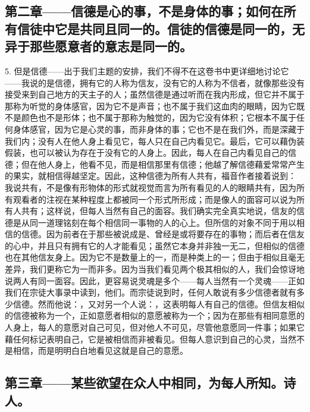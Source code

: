 \subsection{第二章——信德是心的事，不是身体的事；如何在所有信徒中它是共同且同一的。信徒的信德是同一的，无异于那些愿意者的意志是同一的。}

5. 但是信德——出于我们主题的安排，我们不得不在这卷书中更详细地讨论它——我说的是信德，拥有它的人称为信友，没有它的人称为不信者，就像那些没有接受来到自己地方的天主子的人；虽然信德是通过听而在我内形成，但它并不属于那称为听觉的身体感官，因为它不是声音；也不属于我们这血肉的眼睛，因为它既不是颜色也不是形体；也不属于那称为触觉的，因为它没有体积；它根本不属于任何身体感官，因为它是心灵的事，而非身体的事；它也不是在我们外，而是深藏于我们内；没有人在他人身上看见它，每人只在自己内看见它。最后，它可以藉伪装假装，也可以被认为存在于没有它的人身上。因此，每人在自己内看见自己的信德；但在他人身上，他看不见，而是相信那里有信德；他越了解信德藉爱常常产生的果实，就相信得越坚定。因此，这种信德为所有人共有，福音作者接着说到： 我说共有，不是像有形物体的形式就视觉而言为所有看见的人的眼睛共有，因为所有观看者的注视在某种程度上都被同一个形式所形成；而是像人的面容可以说为所有人共有；这样说，但每人当然有自己的面容。我们确实完全真实地说，信友的信德是从同一道理铭刻在每个相信同一事物的人的心上。但所信的对象不同于用以相信的信德。因为前者在于那些被说成是、曾经是或将要存在的事物；而后者在信友的心中，并且只有拥有它的人才能看见；虽然它本身并非独一无二，但相似的信德也在其他信友身上。因为它不是数量上的一，而是种类上的一；但由于相似且毫无差异，我们更称它为一而非多。因为当我们看见两个极其相似的人，我们会惊讶地说两人有同一面容。因此，更容易说灵魂是多个——每人当然有一个灵魂——正如我们在宗徒大事录中读到，他们。而宗徒说到时，任何人敢说有多少信德者就有多少信德。然而他说：，又对另一个人说：，这表明每人有自己的信德。但信友相似的信德被称为一个，正如意愿者相似的意愿被称为一个；因为在那些有相同意愿的人身上，每人的意愿对自己可见，但对他人不可见，尽管他意愿同一件事；如果它藉任何标记表明自己，它是被相信而非被看见。但每人意识到自己的心灵，当然不是相信，而是明明白白地看见这就是自己的意愿。\par


\subsection{第三章——某些欲望在众人中相同，为每人所知。诗人。}

